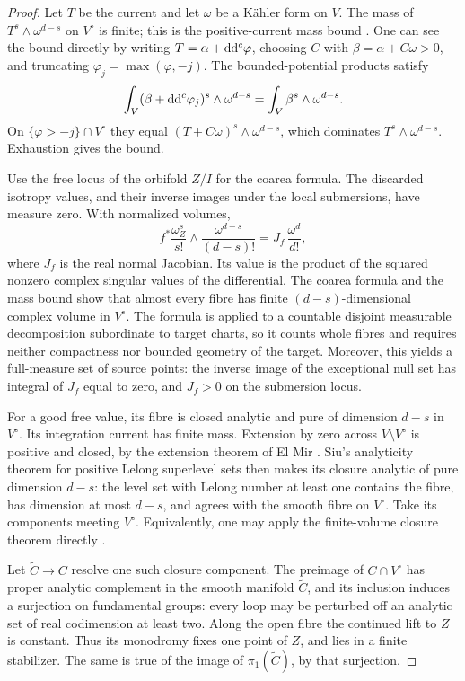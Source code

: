 \begin{proof}
Let \(T\) be the current and let \(\omega\) be a K\"ahler form on
\(V\). The mass of \(T^s\wedge\omega^{d-s}\) on \(V^\circ\) is
finite; this is the positive-current mass bound
\cite{Boucksom2002}. One can see the bound directly
by writing \(T=\alpha+\mathrm d\mathrm d^c\varphi\), choosing \(C\) with
\(\beta=\alpha+C\omega>0\), and truncating
\(\varphi_j=\max(\varphi,-j)\). The bounded-potential products satisfy
\[
 \int_V(\beta+\mathrm d\mathrm d^c\varphi_j)^s\wedge\omega^{d-s}
 =\int_V\beta^s\wedge\omega^{d-s}.
\]
On \(\{\varphi>-j\}\cap V^\circ\) they equal
\((T+C\omega)^s\wedge\omega^{d-s}\), which dominates
\(T^s\wedge\omega^{d-s}\). Exhaustion gives the bound.

Use the free locus of the orbifold \(Z/I\) for the coarea formula.
The discarded isotropy values, and their inverse images under the
local submersions, have measure zero. With normalized volumes,
\[
 f^*\frac{\omega_Z^s}{s!}\wedge
       \frac{\omega^{d-s}}{(d-s)!}
 =J_f\,\frac{\omega^d}{d!},
\]
where \(J_f\) is the real normal Jacobian. Its value is the product
of the squared nonzero complex singular values of the differential.
The coarea formula and the mass bound show that almost every
fibre has finite \((d-s)\)-dimensional complex volume in \(V^\circ\).
The formula is applied to a countable disjoint measurable
decomposition subordinate to target charts, so it counts whole
fibres and requires neither compactness nor bounded geometry of
the target. Moreover, this yields a full-measure set of source
points: the inverse image of the exceptional null set has integral
of \(J_f\) equal to zero, and \(J_f>0\) on the submersion locus.

For a good free value, its fibre is closed analytic and pure of
dimension \(d-s\) in \(V^\circ\). Its integration current has finite
mass. Extension by zero across \(V\setminus V^\circ\) is positive
and closed, by the extension theorem of El Mir
\cite{ElMir1984}.
Siu's analyticity theorem for positive Lelong superlevel sets
\cite{Siu1974} then makes its closure analytic of pure dimension
\(d-s\): the level set with Lelong number at least one contains
the fibre, has dimension at most \(d-s\), and agrees with the
smooth fibre on \(V^\circ\). Take its components meeting
\(V^\circ\). Equivalently, one may apply the finite-volume
closure theorem directly \cite{ElMir1984}.

Let \(\widetilde C\to C\) resolve one such closure component.
The preimage of \(C\cap V^\circ\) has proper analytic complement
in the smooth manifold \(\widetilde C\), and its inclusion induces
a surjection on fundamental groups: every loop may be perturbed
off an analytic set of real codimension at least two.
Along the open fibre the continued lift to \(Z\) is constant.
Thus its monodromy fixes one point of \(Z\), and lies in a finite
stabilizer. The same is true of the image of
\(\pi_1(\widetilde C)\), by that surjection.


\end{proof}
